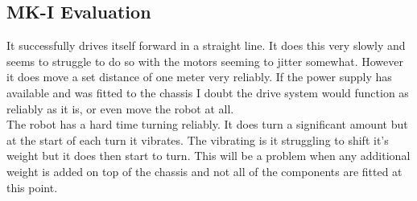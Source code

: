 \subsection{MK-I Evaluation}
It successfully drives itself forward in a straight line.  It does this very slowly and seems to struggle to do so with the motors seeming to jitter somewhat.  However it does move a set distance of one meter very reliably.  If the power supply has available and was fitted to the chassis I doubt the drive system would function as reliably as it is, or even move the robot at all.
\\The robot has a hard time turning reliably.  It does turn a significant amount but at the start of each turn it vibrates.  The vibrating is it struggling to shift it's weight but it does then start to turn.  This will be a problem when any additional weight is added on top of the chassis and not all of the components are fitted at this point.
